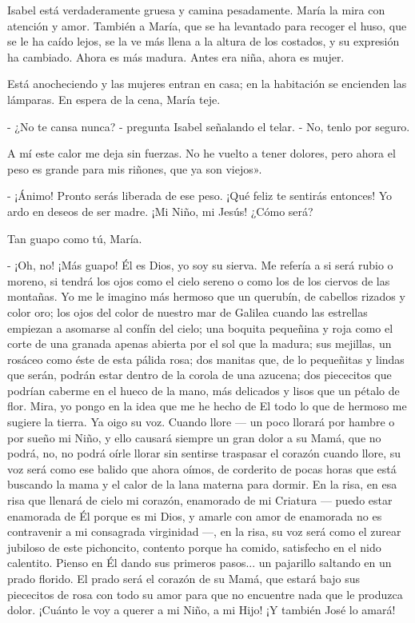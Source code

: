 \documentclass[12pt, twoside, openright]{book} %
\begin{document}
Isabel está verdaderamente gruesa y camina pesadamente. María la mira con atención y amor. También a María, que se ha levantado para recoger el huso, que se le ha caído lejos, se la ve más llena a la altura de los costados, y su expresión ha cambiado. Ahora es más madura. Antes era niña, ahora es mujer. 

Está anocheciendo y las mujeres entran en casa; en la habitación se encienden las lámparas. En espera de la cena, María teje. 

- ¿No te cansa nunca? - pregunta Isabel señalando el telar. - No, tenlo por seguro. 

A mí este calor me deja sin fuerzas. No he vuelto a tener dolores, pero ahora el peso es grande para mis riñones, que ya son viejos». 

- ¡Ánimo! Pronto serás liberada de ese peso. ¡Qué feliz te sentirás entonces! Yo ardo en deseos de ser madre. ¡Mi Niño, mi Jesús! ¿Cómo será? 

Tan guapo como tú, María. 

- ¡Oh, no! ¡Más guapo! Él es Dios, yo soy su sierva. Me refería a si será rubio o moreno, si tendrá los ojos como el cielo sereno o como los de los ciervos de las montañas. Yo me le imagino más hermoso que un querubín, de cabellos rizados y color oro; los ojos del color de nuestro mar de Galilea cuando las estrellas empiezan a asomarse al confín del cielo; una boquita pequeñina y roja como el corte de una granada apenas abierta por el sol que la madura; sus mejillas, un rosáceo como éste de esta pálida rosa; dos manitas que, de lo pequeñitas y lindas que serán, podrán estar dentro de la corola de una azucena; dos piececitos que podrían caberme en el hueco de la mano, más delicados y lisos que un pétalo de flor. Mira, yo pongo en la idea que me he hecho de El todo lo que de hermoso me sugiere la tierra. Ya oigo su voz. Cuando llore — un poco llorará por hambre o por sueño mi Niño, y ello causará siempre un gran dolor a su Mamá, que no podrá, no, no podrá oírle llorar sin sentirse traspasar el corazón cuando llore, su voz será como ese balido que ahora oímos, de corderito de pocas horas que está buscando la mama y el calor de la lana materna para dormir. En la risa, en esa risa que llenará de cielo mi corazón, enamorado de mi Criatura — puedo estar enamorada de Él porque es mi Dios, y amarle con amor de enamorada no es contravenir a mi consagrada virginidad —, en la risa, su voz será como el zurear jubiloso de este pichoncito, contento porque ha comido, satisfecho en el nido calentito. Pienso en Él dando sus primeros pasos... un pajarillo saltando en un prado florido. El prado será el corazón de su Mamá, que estará bajo sus piececitos de rosa con todo su amor para que no encuentre nada que le produzca dolor. ¡Cuánto le voy a querer a mi Niño, a mi Hijo! ¡Y también José lo amará! 
\end{document}
